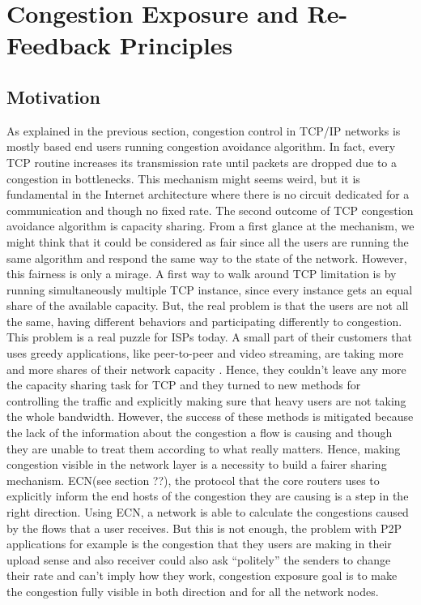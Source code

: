 \section{Congestion Exposure and Re-Feedback Principles}
\subsection{Motivation}

As explained in the previous section, congestion control in TCP/IP networks is mostly based end users running congestion avoidance algorithm. In fact, every TCP routine increases its transmission rate until packets are dropped due to a congestion in bottlenecks. This mechanism might seems weird, but it is fundamental in the Internet architecture where there is no circuit dedicated for a communication and though no fixed rate. The second outcome of TCP congestion avoidance algorithm is capacity sharing. From a first glance at the mechanism, we might think that it could be considered as fair since all the users are  running the same algorithm and respond the same way to the state of the network. However, this fairness is only a mirage. A first way to walk around TCP limitation is by running simultaneously multiple TCP instance, since every instance gets an equal share of the available capacity. But, the real problem is that the users are not all the same, having different behaviors and participating differently to congestion. This problem is a real puzzle for ISPs today. A small part of their customers that uses greedy applications, like peer-to-peer and video streaming, are taking more and more shares of their network capacity \cite{RFC5594}.  Hence, they couldn't leave any more the capacity sharing task for TCP and they turned to new methods for controlling the traffic and explicitly making sure that heavy users are not taking the whole bandwidth. However, the success of these methods is mitigated because the lack of the information about the congestion a flow is causing and though they are unable to treat them according to what really matters. Hence, making congestion visible in the network layer is a necessity to build a fairer sharing mechanism. ECN(see section ??), the protocol that the core routers uses to explicitly inform the end hosts of the congestion they are causing is  a step in the right direction.  Using ECN, a network is able to calculate the congestions caused by the flows that a user receives. But this is not enough, the problem with P2P applications for example is the congestion that they users are making in their upload sense and also receiver could also ask “politely” the senders to change their rate and can't imply how they work,  congestion exposure goal is to make the congestion fully visible in both direction and for all the network nodes.

